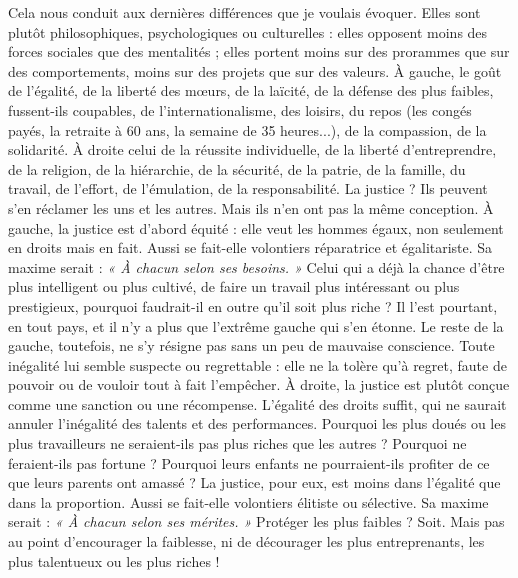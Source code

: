 Cela nous conduit aux dernières différences que je voulais évoquer. Elles
sont plutôt philosophiques, psychologiques ou culturelles : elles opposent
moins des forces sociales que des mentalités ; elles portent moins sur des prorammes
que sur des comportements, moins sur des projets que sur des valeurs.
À gauche, le goût de l'égalité, de la liberté des mœurs, de la laïcité, de la défense
des plus faibles, fussent-ils coupables, de l’internationalisme, des loisirs, du
repos (les congés payés, la retraite à 60 ans, la semaine de 35 heures...), de la
compassion, de la solidarité. À droite celui de la réussite individuelle, de la
liberté d’entreprendre, de la religion, de la hiérarchie, de la sécurité, de la
patrie, de la famille, du travail, de l'effort, de l’émulation, de la responsabilité.
La justice ? Ils peuvent s’en réclamer les uns et les autres. Mais ils n’en ont pas
la même conception. À gauche, la justice est d’abord équité : elle veut les
hommes égaux, non seulement en droits mais en fait. Aussi se fait-elle volontiers
réparatrice et égalitariste. Sa maxime serait : {\it « À chacun selon ses besoins. »}
Celui qui a déjà la chance d’être plus intelligent ou plus cultivé, de faire un travail
plus intéressant ou plus prestigieux, pourquoi faudrait-il en outre qu’il soit
plus riche ? Il l’est pourtant, en tout pays, et il n’y a plus que l’extrême gauche
qui s’en étonne. Le reste de la gauche, toutefois, ne s’y résigne pas sans un peu
de mauvaise conscience. Toute inégalité lui semble suspecte ou regrettable : elle
ne la tolère qu’à regret, faute de pouvoir ou de vouloir tout à fait l'empêcher. À
droite, la justice est plutôt conçue comme une sanction ou une récompense.
L'égalité des droits suffit, qui ne saurait annuler l’inégalité des talents et des
performances. Pourquoi les plus doués ou les plus travailleurs ne seraient-ils pas
plus riches que les autres ? Pourquoi ne feraient-ils pas fortune ? Pourquoi leurs
enfants ne pourraient-ils profiter de ce que leurs parents ont amassé ? La justice,
pour eux, est moins dans l'égalité que dans la proportion. Aussi se fait-elle
volontiers élitiste ou sélective. Sa maxime serait : {\it « À chacun selon ses mérites. »}
Protéger les plus faibles ? Soit. Mais pas au point d’encourager la faiblesse, ni
de décourager les plus entreprenants, les plus talentueux ou les plus riches !

